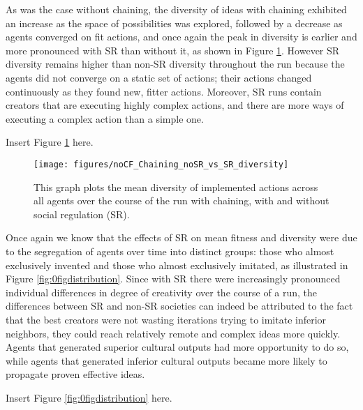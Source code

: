 \documentclass[a4paper,12pt,man,british]{apa6}
\begin{document}
As was the case without chaining, the diversity of ideas with chaining exhibited an increase as the space of possibilities was explored, followed by a decrease as agents converged on fit actions, and once again the peak in diversity is earlier and more pronounced with SR than without it, as shown in Figure \ref{fig:F5-no-CF-yes-Chaining-diversity}. 
However SR diversity remains higher than non-SR diversity throughout the run because the agents did not converge on a static set of actions; their actions changed continuously as they found new, fitter actions. Moreover, SR runs contain creators that are executing highly complex actions, and there are more ways of executing a complex action than a simple one.

\begin{center} %
Insert Figure \ref{fig:F5-no-CF-yes-Chaining-diversity} here.
\end{center}
\begin{figure}
\centering
\texttt{[image: figures/noCF\_Chaining\_noSR\_vs\_SR\_diversity]}
\caption{This graph plots the  mean diversity of implemented actions across all agents over the course of the run with chaining, with and without social regulation (SR).}
\label{fig:F5-no-CF-yes-Chaining-diversity}
\end{figure}

Once again we know that the effects of SR on mean fitness and diversity were due to the segregation of agents over time into distinct groups: those who almost exclusively invented and those who almost exclusively imitated, as illustrated in Figure \ref{fig:0figdistribution}. Since with SR there were increasingly pronounced individual differences in degree of creativity over the course of a run, the differences between SR and non-SR societies can indeed be attributed to the fact that the best creators were not wasting iterations trying to imitate inferior neighbors, they could reach relatively remote and complex ideas more quickly. Agents that generated superior cultural outputs had more opportunity to do so, while agents that generated inferior cultural outputs became more likely to propagate proven effective ideas.

\begin{center}
Insert Figure \ref{fig:0figdistribution} here.
\end{center}
\end{document}
